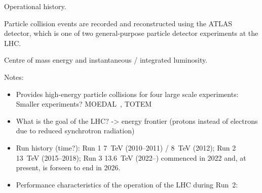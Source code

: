 Operational history.

Particle collision events are recorded and reconstructed using the ATLAS
detector, which is one of two general-purpose particle detector experiments at
the LHC.

Centre of mass energy and instantaneous / integrated luminosity.






Notes:
\begin{itemize}

  \begin{itemize}

  \item Synchrotron: 1232 dipoles (superconducting) -> Magnetic field of
    \SI{8.3}{\tesla} required for \SI{7}{\TeV} beam energy operation /
    quadrupole magnets for focussing of the beam

  \item Two proton beams circulating in opposite directions. In bunches. What
    are bunches? -> Symmetric

  \item Accelerator chain (\pp): LINAC 2 (\textbf{LIN}ear \textbf{AC}celerator)
    -> Proton Synchrotron Booster -> Proton Synchrotron (PS) -> Super Proton
    Synchrotron (SPS) (injection energy of \SI{450}{\GeV})-> LHC
  \end{itemize}

\item Provides high-energy particle collisions for four large scale experiments:
   Smaller experiments?  MOEDAL~\cite{MoEDAL:2009jwa},
  TOTEM~\cite{TOTEM:2008lue}

\item What is the goal of the LHC? -> energy frontier (protons instead of
  electrons due to reduced synchrotron radiation)

\item Run history (time?): Run 1 \SI{7}{\TeV} (2010--2011) / \SI{8}{\TeV}
  (2012); Run 2 \SI{13}{\TeV} (2015--2018); Run 3 \SI{13.6}{\TeV} (2022--)
  commenced in 2022 and, at present, is forseen to end in 2026.

\item Performance characteristics of the \pp operation of the LHC during Run~2:


\end{itemize}
